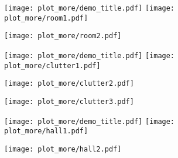 \documentclass[10pt,twocolumn,letterpaper]{article}
\begin{document}
\begin{figure*}
\centering
  \begin{subfigure}{\linewidth}
    \texttt{[image: plot\_more/demo\_title.pdf]}
    \texttt{[image: plot\_more/room1.pdf]}
  \caption{}
  \end{subfigure}
  \begin{subfigure}{\linewidth}
    \texttt{[image: plot\_more/room2.pdf]}
  \caption{}
  \end{subfigure}
\caption{Large rooms.
We compare the results of ConvNet baseline with CBL. On the every second row, we visualize the boundary points calculated from the ground truth label, and the feature discrimination among neighboring points for each model.
The improvement on the first row and the enhanced feature discrimination on the second row show that CBL improves the features across boundaries to obtain a better segmentation quality on boundary areas.
The visualization is done on S3DIS testset Area 5.
}
\label{fig:demo_more_room}
\end{figure*}


\begin{figure*}  \centering
  \begin{subfigure}{\linewidth}
    \texttt{[image: plot\_more/demo\_title.pdf]}
    \texttt{[image: plot\_more/clutter1.pdf]}
  \end{subfigure}
  \begin{subfigure}{\linewidth}
    \texttt{[image: plot\_more/clutter2.pdf]}
  \end{subfigure}
  \begin{subfigure}{\linewidth}
    \texttt{[image: plot\_more/clutter3.pdf]}
  \end{subfigure}

\caption{Cluttered space. Same as above (\cref{fig:demo_more_room}).}
\label{fig:demo_more_clutter}

\end{figure*}

\begin{figure*}
\centering
  \begin{subfigure}{\linewidth}
    \texttt{[image: plot\_more/demo\_title.pdf]}
    \texttt{[image: plot\_more/hall1.pdf]}
  \caption{}
  \end{subfigure}
  \begin{subfigure}{\linewidth}
    \texttt{[image: plot\_more/hall2.pdf]}
  \caption{}
  \end{subfigure}
\caption{Hallways. Same as above (\cref{fig:demo_more_room}).}
\label{fig:demo_more_hall}
\end{figure*}
\end{document}
